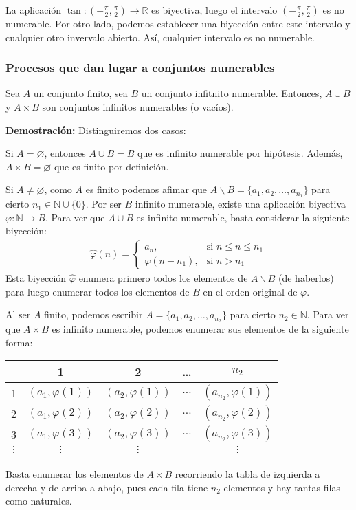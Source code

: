 \documentclass[12pt,a4paper]{article}
\newcommand{\R}{\mathbb{R}}
\newcommand{\N}{\mathbb{N}}
\newcounter{unit}[section]
\renewcommand{\theunit}{\arabic{unit}}
\renewcommand{\thesubsubsection}{\theunit.\arabic{subsubsection}}
\newcommand{\dem}{
    \noindent \underline{\textbf{Demostración:}}
}
\newcommand{\result}[1]{%
  \subsubsection{#1}%
  \label{subsubsection:\thesubsubsection}%
}
\begin{document}
\vspace{6mm}
La aplicación $\tan : (-\frac{\pi}{2}, \frac{\pi}{2}) \longrightarrow \R$ es biyectiva, luego el intervalo
$(-\frac{\pi}{2}, \frac{\pi}{2})$ es no numerable. Por otro lado, podemos establecer una biyección entre
este intervalo y cualquier otro invervalo abierto. Así, cualquier intervalo es no numerable.

\result{Procesos que dan lugar a conjuntos numerables}
\hspace{3mm}
Sea $A$ un conjunto finito, sea $B$ un conjunto infitnito numerable. Entonces,
$A \cup B$ y $A \times B$ son conjuntos infinitos numerables (o vacíos).

\vspace{4mm}
\dem Distinguiremos dos casos:

\vspace{2mm}
Si $A = \varnothing$, entonces $A \cup B = B$ que es infinito numerable por hipótesis.
Además, $A \times B = \varnothing$ que es finito por definición.

\vspace{4mm}
Si $A \neq \varnothing$, como $A$ es finito podemos afimar que $A\backslash B = \{a_1, a_2, \ldots, a_{n_1}\}$
para cierto $n_1 \in \N \cup \{0\}$. Por ser $B$ infinito numerable, existe una aplicación biyectiva $\varphi : \N \to B$.
Para ver que $A \cup B$ es infinito numerable, basta considerar la siguiente biyección:
\begin{align*}
    \hat{\varphi} (n) = \begin{cases}
    a_n, & \text{si } n \leq n \leq n_1 \\
    \varphi(n - n_1), & \text{si } n > n_1
    \end{cases}
\end{align*}
Esta biyección $\hat{\varphi}$ enumera primero todos los elementos de $A \backslash B$ (de haberlos)
para luego enumerar todos los elementos de $B$ en el orden original de $\varphi$.

\vspace{4mm}
Al ser $A$ finito, podemos escribir $A = \{a_1, a_2, \ldots, a_{n_2}\}$ para cierto $n_2 \in \N$.
Para ver que $A \times B$ es infinito numerable, podemos enumerar sus elementos de la siguiente forma:
\begin{center}
\begin{tabular}{c|cccc}
    & 1 & 2 & \ldots & $n_2$ \\
    \hline
    1 & $(a_1, \varphi(1))$ & $(a_2, \varphi(1))$ & $\ldots$ & $(a_{n_2}, \varphi(1))$ \\
    2 & $(a_1, \varphi(2))$ & $(a_2, \varphi(2))$ & $\ldots$ & $(a_{n_2}, \varphi(2))$ \\
    3 & $(a_1, \varphi(3))$ & $(a_2, \varphi(3))$ & $\ldots$ & $(a_{n_2}, \varphi(3))$ \\
    $\vdots$ & $\vdots$ & $\vdots$ & & $\vdots$ \\
\end{tabular}
\end{center}
\vspace{2mm}
Basta enumerar los elementos de $A \times B$ recorriendo la tabla de izquierda a derecha y de arriba a abajo,
pues cada fila tiene $n_2$ elementos y hay tantas filas como naturales.
\end{document}
